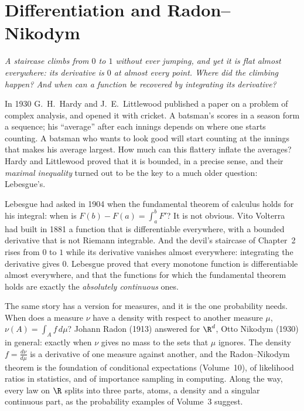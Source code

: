 \chapter{Differentiation and Radon--Nikodym}

\begin{center}\itshape
A staircase climbs from $0$ to $1$ without ever jumping, and yet it is flat almost everywhere: its derivative is $0$ at almost
every point. Where did the climbing happen? And when can a function be recovered by integrating its derivative?
\end{center}

In 1930 G.~H.~Hardy and J.~E.~Littlewood published a paper on a problem of complex analysis, and opened it with cricket. A
batsman's scores in a season form a sequence; his ``average'' after each innings depends on where one starts counting. A
batsman who wants to look good will start counting at the innings that makes his average largest. How much can this
flattery inflate the averages? Hardy and Littlewood proved that it is bounded, in a precise sense, and their \emph{maximal
inequality} turned out to be the key to a much older question: Lebesgue's.

Lebesgue had asked in 1904 when the fundamental theorem of calculus holds for his integral: when is $F(b)-F(a)=\int_a^bF'$?
It is not obvious. Vito Volterra had built in 1881 a function that is differentiable everywhere, with a bounded derivative that
is not Riemann integrable. And the devil's staircase of Chapter~2 rises from $0$ to $1$ while its derivative vanishes almost
everywhere: integrating the derivative gives $0$. Lebesgue proved that every monotone function is differentiable almost
everywhere, and that the functions for which the fundamental theorem holds are exactly the \emph{absolutely continuous} ones.

The same story has a version for measures, and it is the one probability needs. When does a measure $\nu$ have a density with
respect to another measure $\mu$, $\nu(A)=\int_Af\,d\mu$? Johann Radon (1913) answered for $\R^d$, Otto Nikodym (1930) in general:
exactly when $\nu$ gives no mass to the sets that $\mu$ ignores. The density $f=\frac{d\nu}{d\mu}$ is a derivative of one measure
against another, and the Radon--Nikodym theorem is the foundation of conditional expectations (Volume~10), of likelihood ratios in
statistics, and of importance sampling in computing. Along the way, every law on $\R$ splits into three parts, atoms, a density
and a singular continuous part, as the probability examples of Volume~3 suggest.

